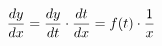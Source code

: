 \documentclass[preview]{standalone}
\begin{document}
\begin{align*}
\special{dvisvgm:raw <g id='unique000'>}\frac{dy}{dx} = \frac{dy}{dt} \cdot \frac{dt}{dx} = f(t) \cdot \frac{1}{x}\special{dvisvgm:raw </g>}
\end{align*}
\end{document}
